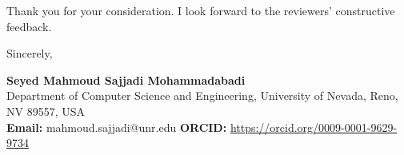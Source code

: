 \documentclass[10pt,letterpaper]{article}
\begin{document}
Thank you for your consideration. I look forward to the reviewers' constructive feedback.

\vspace{6pt}
Sincerely,

\vspace{4pt}
\textbf{Seyed Mahmoud Sajjadi Mohammadabadi}\\
Department of Computer Science and Engineering, University of Nevada, Reno, NV 89557, USA\\
\textbf{Email:} mahmoud.sajjadi@unr.edu \quad \textbf{ORCID:} \url{https://orcid.org/0009-0001-9629-9734}
\end{document}
